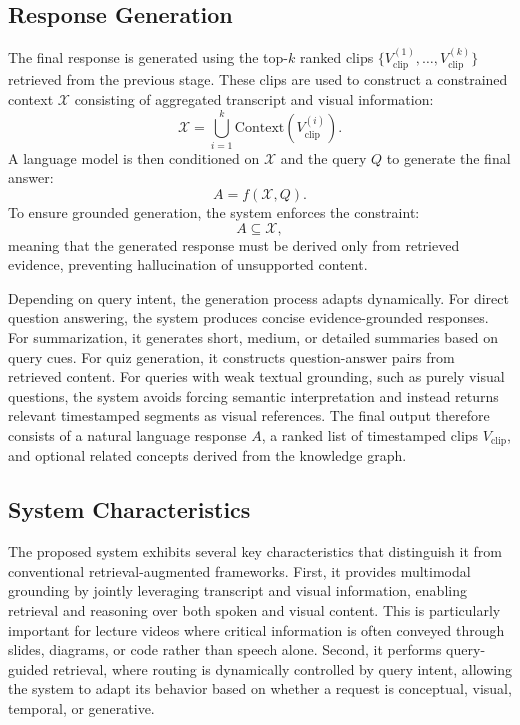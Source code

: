\documentclass[conference]{IEEEtran}
\begin{document}
    \subsection{Response Generation}

    The final response is generated using the top-$k$ ranked clips $\{V_{\text{clip}}^{(1)}, \dots, V_{\text{clip}}^{(k)}\}$ retrieved from the previous stage. These clips are used to construct a constrained context $\mathcal{X}$ consisting of aggregated transcript and visual information:
    \begin{equation}
    \mathcal{X} = \bigcup_{i=1}^{k} \text{Context}\left(V_{\text{clip}}^{(i)}\right).
    \end{equation}
    A language model is then conditioned on $\mathcal{X}$ and the query $Q$ to generate the final answer:
    \begin{equation}
    A = f(\mathcal{X}, Q).
    \end{equation}
    To ensure grounded generation, the system enforces the constraint:
    \begin{equation}
    A \subseteq \mathcal{X},
    \end{equation}
    meaning that the generated response must be derived only from retrieved evidence, preventing hallucination of unsupported content.

    Depending on query intent, the generation process adapts dynamically. For direct question answering, the system produces concise evidence-grounded responses. For summarization, it generates short, medium, or detailed summaries based on query cues. For quiz generation, it constructs question-answer pairs from retrieved content. For queries with weak textual grounding, such as purely visual questions, the system avoids forcing semantic interpretation and instead returns relevant timestamped segments as visual references. The final output therefore consists of a natural language response $A$, a ranked list of timestamped clips $V_{\text{clip}}$, and optional related concepts derived from the knowledge graph.

    \subsection{System Characteristics}

    The proposed system exhibits several key characteristics that distinguish it from conventional retrieval-augmented frameworks. First, it provides multimodal grounding by jointly leveraging transcript and visual information, enabling retrieval and reasoning over both spoken and visual content. This is particularly important for lecture videos where critical information is often conveyed through slides, diagrams, or code rather than speech alone. Second, it performs query-guided retrieval, where routing is dynamically controlled by query intent, allowing the system to adapt its behavior based on whether a request is conceptual, visual, temporal, or generative.
\end{document}
